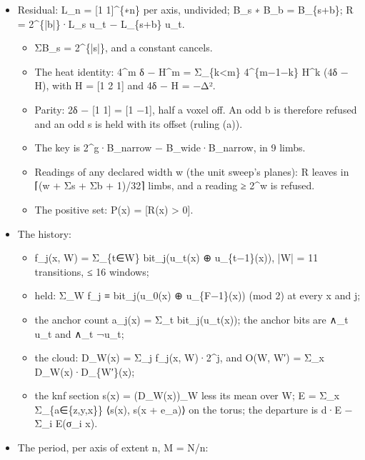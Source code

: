 \begin{itemize}
\item Residual: L\_\allowbreak{}n = [1 1]\textasciicircum{}\{∗n\} per axis, undivided; B\_\allowbreak{}s ∗ B\_\allowbreak{}b = B\_\allowbreak{}\{s+b\}; R = 2\textasciicircum{}\{|b|\}·L\_\allowbreak{}s u\_\allowbreak{}t − L\_\allowbreak{}\{s+b\} u\_\allowbreak{}t.

\begin{itemize}
\item ΣB\_\allowbreak{}s = 2\textasciicircum{}\{|s|\}, and a constant cancels.
\item The heat identity: 4\textasciicircum{}m δ − H\textasciicircum{}m = Σ\_\allowbreak{}\{k<m\} 4\textasciicircum{}\{m−1−k\} H\textasciicircum{}k (4δ − H), with H = [1 2 1] and 4δ − H = −Δ².
\item Parity: 2δ − [1 1] = [1 −1], half a voxel off. An odd b is therefore refused and an odd s is held with its offset (ruling (a)).
\item The key is 2\textasciicircum{}g·B\_\allowbreak{}narrow − B\_\allowbreak{}wide·B\_\allowbreak{}narrow, in 9 limbs.
\item Readings of any declared width w (the unit sweep's planes): R leaves in ⌈(w + Σs + Σb + 1)/32⌉ limbs, and a reading ≥ 2\textasciicircum{}w is refused.
\item The positive set: P(x) = [R(x) > 0].
\end{itemize}
\item The history:

\begin{itemize}
\item f\_\allowbreak{}j(x, W) = Σ\_\allowbreak{}\{t∈W\} bit\_\allowbreak{}j(u\_\allowbreak{}t(x) ⊕ u\_\allowbreak{}\{t−1\}(x)), |W| = 11 transitions, ≤ 16 windows;
\item held: Σ\_\allowbreak{}W f\_\allowbreak{}j ≡ bit\_\allowbreak{}j(u\_\allowbreak{}0(x) ⊕ u\_\allowbreak{}\{F−1\}(x)) (mod 2) at every x and j;
\item the anchor count a\_\allowbreak{}j(x) = Σ\_\allowbreak{}t bit\_\allowbreak{}j(u\_\allowbreak{}t(x)); the anchor bits are ∧\_\allowbreak{}t u\_\allowbreak{}t and ∧\_\allowbreak{}t ¬u\_\allowbreak{}t;
\item the cloud: D\_\allowbreak{}W(x) = Σ\_\allowbreak{}j f\_\allowbreak{}j(x, W)·2\textasciicircum{}j, and O(W, W′) = Σ\_\allowbreak{}x D\_\allowbreak{}W(x)·D\_\allowbreak{}\{W′\}(x);
\item the knf section s(x) = (D\_\allowbreak{}W(x))\_\allowbreak{}W less its mean over W; E = Σ\_\allowbreak{}x Σ\_\allowbreak{}\{a∈\{z,y,x\}\} ⟨s(x), s(x + e\_\allowbreak{}a)⟩ on the torus; the departure is d·E − Σ\_\allowbreak{}i E(σ\_\allowbreak{}i x).
\end{itemize}
\item The period, per axis of extent n, M = N/n:


\end{itemize}
